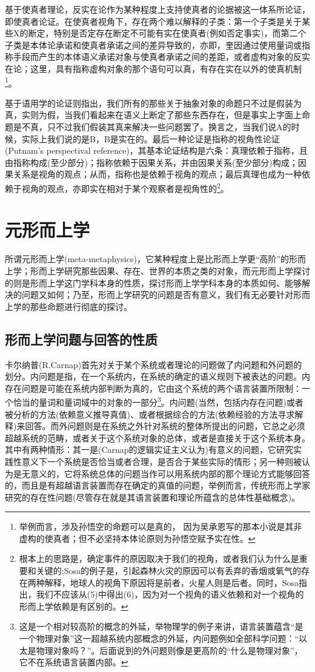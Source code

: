 \documentclass{article}
\begin{document}
基于使真者理论，反实在论作为某种程度上支持使真者的论据被这一体系所论证，即使真者论证。在使真者视角下，存在两个难以解释的子类：第一个子类是关于某些X的断定，特别是否定存在断定不可能有实在使真者(例如否定事实)，而第二个子类是本体论承诺和使真者承诺之间的差异导致的，亦即，奎因通过使用量词或指称手段而产生的本体语义承诺对象与使真者承诺之间的差距，或者虚构对象的反实在论；这里，具有指称虚构对象的那个语句可以真，有存在实在以外的使真机制\footnote{举例而言，涉及孙悟空的命题可以是真的， 因为吴承恩写的那本小说是其非虚构的使真者；但不必坚持本体论原则为孙悟空赋予实在性。}。

基于语用学的论证则指出，我们所有的那些关于抽象对象的命题只不过是假装为真，实则为假，当我们看起来在语义上断定了那些东西存在，但是事实上字面上命题是不真，只不过我们假装其真来解决一些问题罢了。换言之，当我们说A的时候，实际上我们说的是B，B是实在的。最后一种论证是指称的视角性论证(Putnam's perspectival reference)，其基本论证结构是六条：真理依赖于指称，且由指称构成(至少部分)；指称依赖于因果关系，并由因果关系(至少部分)构成；因果关系是视角的观点；从而，指称也是依赖于视角的观点；最后真理也成为一种依赖于视角的观点，亦即实在相对于某个观察者是视角性的\footnote{根本上的思路是，确定事件的原因取决于我们的视角，或者我们认为什么是重要和关键的;Sosa的例子是，引起森林火灾的原因可以有丢弃的香烟或氧气的存在两种解释，地球人的视角下原因将是前者，火星人则是后者。同时，Sosa指出，我们不应该从(5)中得出(6)，因为对一个视角的语义依赖和对一个视角的形而上学依赖是有区别的。}。
\section{元形而上学}
所谓元形而上学(meta-metaphysics)，它某种程度上是比形而上学更“高阶”的形而上学；形而上学研究那些因果、存在、世界的本质之类的对象，而元形而上学探讨的则是形而上学这门学科本身的性质，探讨形而上学学科本身的本质如何、能够解决的问题又如何；乃至，形而上学研究的问题是否有意义，我们有无必要针对形而上学的那些命题进行彻底的探讨。
\subsection{形而上学问题与回答的性质}
卡尔纳普(R.Carnap)首先对关于某个系统或者理论的问题做了内问题和外问题的划分。内问题是指，在一个系统内，在系统的确定的语义规则下被表达的问题。内存在问题是可能在系统内部判断为真的，它由这个系统的两个语言装置所限制：一个恰当的量词和量词域中的对象的一部分\footnote{这是一个相对较高阶的概念的外延，举物理学的例子来讲，语言装置蕴含“是一个物理对象”这一超越系统内部概念的外延，内问题例如全部科学问题：“以太是物理对象吗？”。后面说到的外问题则像是更高阶的“什么是物理对象”，它不在系统语言装置内部。}。内问题(当然，包括内存在问题)或者被分析的方法(依赖意义推导真值)、或者根据综合的方法(依赖经验的方法寻求解释)来回答。而外问题则是在系统之外针对系统的整体所提出的问题，它总之必须超越系统的范畴，或者关于这个系统对象的总体，或者是直接关于这个系统本身。其中有两种情形：其一是(Carnap的逻辑实证主义认为)有意义的问题，它研究实践性意义下一个系统是否恰当或者合理，是否合于某些实际的情形；另一种则被认为是无意义的，它将系统总体的问题当作可以用系统内部的那个理论方式能够回答的，而且是有超越语言装置而存在确定的真值的问题，举例而言，传统形而上学家研究的存在性问题(尽管存在就是其语言装置和理论所蕴含的总体性基础概念)。
\end{document}
